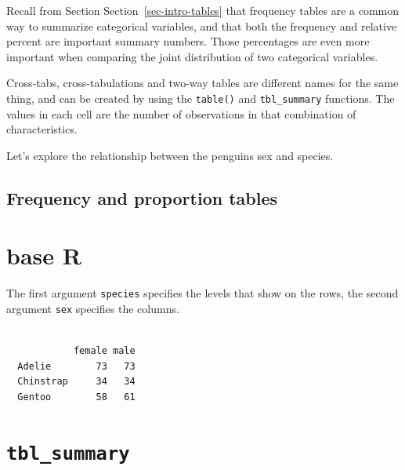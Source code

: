 \documentclass[
  letterpaper,
  DIV=11,
  numbers=noendperiod,
  oneside]{scrreprt}
\newenvironment{Shaded}{\begin{snugshade}}{\end{snugshade}}
\newcommand{\FunctionTok}[1]{\textcolor[rgb]{0.28,0.35,0.67}{#1}}
\newcommand{\NormalTok}[1]{\textcolor[rgb]{0.00,0.23,0.31}{#1}}
\newcommand{\SpecialCharTok}[1]{\textcolor[rgb]{0.37,0.37,0.37}{#1}}
\begin{document}
Recall from Section Section~\ref{sec-intro-tables} that frequency tables
are a common way to summarize categorical variables, and that both the
frequency and relative percent are important summary numbers. Those
percentages are even more important when comparing the joint
distribution of two categorical variables.

Cross-tabs, cross-tabulations and two-way tables are different names for
the same thing, and can be created by using the \texttt{table()} and
\texttt{tbl\_summary} functions. The values in each cell are the number
of observations in that combination of characteristics.
{}

Let's explore the relationship between the penguins sex and species.

\subsection{Frequency and proportion
tables}\label{frequency-and-proportion-tables}

\section{base R}

The first argument \texttt{species} specifies the levels that show on
the rows, the second argument \texttt{sex} specifies the columns.

\begin{Shaded}
\end{Shaded}

\begin{verbatim}
           
            female male
  Adelie        73   73
  Chinstrap     34   34
  Gentoo        58   61
\end{verbatim}

\section{\texorpdfstring{\texttt{tbl\_summary}}{tbl\_summary}}
\end{document}
